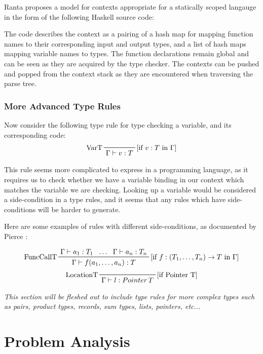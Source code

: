 \documentclass{UoYCSproject}
\begin{document}
Ranta \cite{Ranta} proposes a model for contexts appropriate for a statically
scoped langauge in the form of the following Haskell source code:

The code describes the context as a pairing of a hash map for mapping function
names to their corresponding input and output types, and a list of hash maps
mapping variable names to types. The function declarations remain global and can
be seen as they are acquired by the type checker. The contexts can be pushed
and popped from the context stack as they are encountered when traversing the
parse tree.

\subsection{More Advanced Type Rules}
Now consider the following type rule for type checking a variable, and its
corresponding code:
\begin{displaymath}
    \prftree[l,r]{[if $v:T$ in $\Gamma$]}{VarT}{\Gamma \vdash v:T}
\end{displaymath}


This rule seems more complicated to express in a programming language, as it
requires us to check whether we have a variable binding in our context which
matches the variable we are checking. Looking up a variable would be considered
a side-condition in a type rules, and it seems that any rules which have
side-conditions will be harder to generate.

Here are some examples of rules with different side-conditions, as documented
by Pierce \cite{PierceTAPL}:

\begin{displaymath}
\prftree[l, r]{[if $f:(T_1, \dots, T_n) \rightarrow T$ in $\Gamma$]}{FuncCallT}{\Gamma \vdash a_1:T_1}{\dots}{\Gamma \vdash a_n:T_n}{\Gamma \vdash f(a_1, \dots, a_n):T}
\end{displaymath}
\begin{displaymath}
\prftree[l, r]{[if Pointer T]}{LocationT}{\Gamma \vdash l:Pointer \, T}
\end{displaymath}

\textit{This section will be fleshed out to include type rules for more complex
    types such as pairs, product types, records, sum types, lists,
    pointers, etc...}



\chapter{Problem Analysis}
\end{document}
